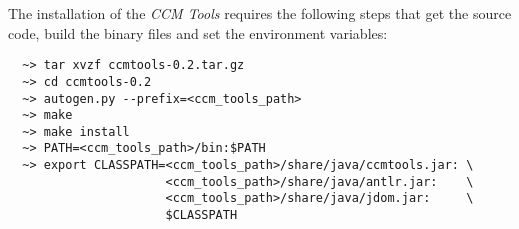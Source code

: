 The installation of the {\it CCM Tools} requires the following steps that get
the source code, build the binary files and set the environment variables:
\begin{verbatim}
  ~> tar xvzf ccmtools-0.2.tar.gz
  ~> cd ccmtools-0.2
  ~> autogen.py --prefix=<ccm_tools_path>
  ~> make
  ~> make install
  ~> PATH=<ccm_tools_path>/bin:$PATH
  ~> export CLASSPATH=<ccm_tools_path>/share/java/ccmtools.jar: \
                      <ccm_tools_path>/share/java/antlr.jar:    \
                      <ccm_tools_path>/share/java/jdom.jar:     \
                      $CLASSPATH
\end{verbatim}












